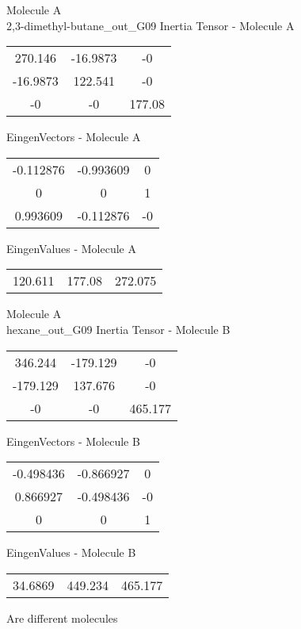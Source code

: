 \newpage
\begin{multicols}{2}
\begin{center}
Molecule A \\ 
2,3-dimethyl-butane_out_G09
Inertia Tensor - Molecule A \\
\vtab
\begin{tabular}{|c c c|}
270.146	 & 	-16.9873	 & 	-0	 \\
-16.9873	 & 	122.541	 & 	-0	 \\
-0	 & 	-0	 & 	177.08
\end{tabular}

\vtab
 EingenVectors - Molecule A     \\
\vtab
\begin{tabular}{|c c c|}
-0.112876	 & 	-0.993609	 & 	0	 \\
0	 & 	0	 & 	1	 \\
0.993609	 & 	-0.112876	 & 	-0
\end{tabular}

\vtab
 EingenValues - Molecule A     \\
\vtab
\begin{tabular}{|c c c|}
120.611	 & 	177.08	 & 	272.075
\end{tabular}
\columnbreak
Molecule A \\ 
hexane_out_G09
Inertia Tensor - Molecule B \\
\vtab
\begin{tabular}{|c c c|}
346.244	 & 	-179.129	 & 	-0	 \\
-179.129	 & 	137.676	 & 	-0	 \\
-0	 & 	-0	 & 	465.177
\end{tabular}

\vtab
 EingenVectors - Molecule B     \\
\vtab
\begin{tabular}{|c c c|}
-0.498436	 & 	-0.866927	 & 	0	 \\
0.866927	 & 	-0.498436	 & 	-0	 \\
0	 & 	0	 & 	1
\end{tabular}

\vtab
 EingenValues - Molecule B     \\
\vtab
\begin{tabular}{|c c c|}
34.6869	 & 	449.234	 & 	465.177
\end{tabular}
\textcolor{NavyBlue}{\large Are different molecules}
\end{center}
\end{multicols}
